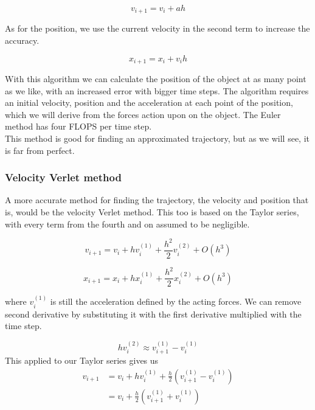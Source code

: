 \documentclass[10pt]{article}
\begin{document}
\begin{multicols}{2}
\begin{equation}
    v_{i+1} = v_i +ah
\end{equation}

As for the position, we use the current velocity in the second term to
increase the accuracy.

\begin{equation}
    x_{i+1} = x_i +v_{i}h
\end{equation}

With this algorithm we can calculate the position of the object at as many
point as we like, with an increased error with bigger time steps. The
algorithm requires an initial velocity, position and the acceleration at
each point of the position, which we will derive from the forces action
upon on the object. The Euler method has four FLOPS per time step.\\

This method is good for finding an approximated trajectory, but as we will
see, it is far from perfect.


\subsubsection{Velocity Verlet method}
A more accurate method for finding the trajectory, the velocity and
position that is, would be the velocity Verlet method. This too is based on
the Taylor series, with every term from the fourth and on assumed to be
negligible.

\begin{equation}
    v_{i+1} = v_i +hv_i^{(1)}+\frac{h^2}{2}v_i^{(2)}+O(h^3)
\end{equation}

\begin{equation}
    x_{i+1} = x_i +hx_i^{(1)}+\frac{h^2}{2}x_i^{(2)}+O(h^3)
\end{equation}

where $v_i^{(1)}$ is still the acceleration defined by the acting forces.
We can remove second derivative by substituting it with the first
derivative multiplied with the time step. 

\begin{equation}
    hv_i^{(2)} \approx v_{i+1}^{(1)}-v_i^{(1)}\nonumber
\end{equation}
This applied to our Taylor series gives us
\begin{align}
    v_{i+1} &= v_i + hv_i^{(1)}+\frac{h}{2}\left(v_{i+1}^{(1)}-v_i^{(1)}\right)\nonumber\\
    &= v_i+\frac{h}{2}\left(v_{i+1}^{(1)}+v_i^{(1)}\right)
\end{align}


\end{multicols}
\end{document}
